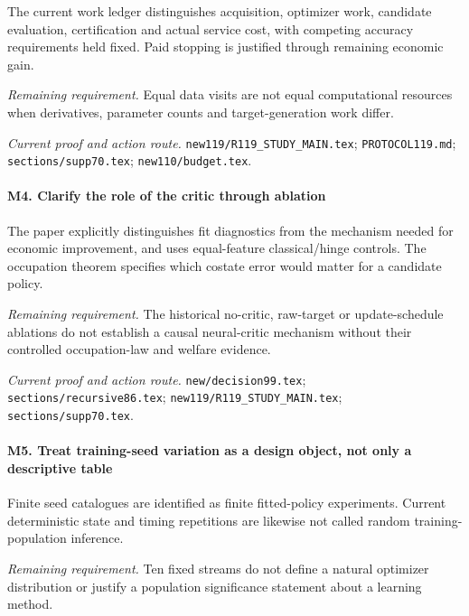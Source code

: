 The current work ledger distinguishes acquisition, optimizer work, candidate evaluation, certification and actual service cost, with competing accuracy requirements held fixed. Paid stopping is justified through remaining economic gain.

\par\emph{Remaining requirement.} Equal data visits are not equal computational resources when derivatives, parameter counts and target-generation work differ.

\par\emph{Current proof and action route.} \nolinkurl{new119/R119_STUDY_MAIN.tex}; \nolinkurl{PROTOCOL119.md}; \nolinkurl{sections/supp70.tex}; \nolinkurl{new110/budget.tex}.

\paragraph{M4. Clarify the role of the critic through ablation}

The paper explicitly distinguishes fit diagnostics from the mechanism needed for economic improvement, and uses equal-feature classical/\allowbreak{}hinge controls. The occupation theorem specifies which costate error would matter for a candidate policy.

\par\emph{Remaining requirement.} The historical no-critic, raw-target or update-schedule ablations do not establish a causal neural-critic mechanism without their controlled occupation-law and welfare evidence.

\par\emph{Current proof and action route.} \nolinkurl{new/decision99.tex}; \nolinkurl{sections/recursive86.tex}; \nolinkurl{new119/R119_STUDY_MAIN.tex}; \nolinkurl{sections/supp70.tex}.

\paragraph{M5. Treat training-seed variation as a design object, not only a descriptive table}

Finite seed catalogues are identified as finite fitted-policy experiments. Current deterministic state and timing repetitions are likewise not called random training-population inference.

\par\emph{Remaining requirement.} Ten fixed streams do not define a natural optimizer distribution or justify a population significance statement about a learning method.

